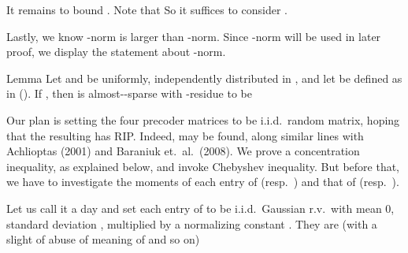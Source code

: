 It remains to bound .
Note that
So it suffices to consider .

Lastly, we know -norm is larger than -norm.
Since -norm will be used in later proof, we display the statement about -norm.

\Result
{Lemma}
{
Let  and  be uniformly, independently distributed in \m {[0,2\pi)}, and let  be defined as in ().
If , then  is almost--sparse with -residue  to be
}

\stopsection

\startsection [title={Moments of Precoders' and Combiners' entries}]

Our plan is setting the four precoder matrices to be i.i.d.\ random matrix, hoping that the resulting  has RIP.
Indeed,  may be found, along similar lines with Achlioptas (2001) and Baraniuk et.\ al.\ (2008).
We prove a concentration inequality, as explained below, and invoke Chebyshev inequality.
But before that, we have to investigate the moments of each entry of  (resp.\ ) and that of  (resp.\ ).

Let us call it a day and set each entry of  to be i.i.d.\ Gaussian r.v.\ with mean 0, standard deviation , multiplied by a normalizing constant .
They are (with a slight of abuse of meaning of  and so on)

